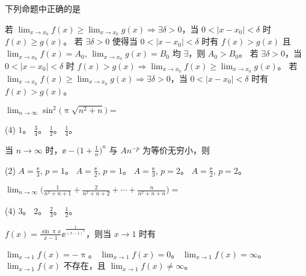 \begin{ti}
	下列命题中正确的是
	\begin{tasks}
		\task 若 $\lim_{x \to x_0} f(x) \geq \lim_{x \to x_0} g(x) \Rightarrow \exists \delta > 0$，当 $0 < |x-x_0| < \delta$ 时 $f(x) \geq g(x)$。\xeCJKnobreak
		\task 若 $\exists \delta > 0$ 使得当 $0 < |x-x_0| < \delta$ 时有 $f(x) > g(x)$ 且 $\lim_{x \to x_0} f(x) = A_0$, $\lim_{x \to x_0} g(x) = B_0$ 均 $\exists$，则 $A_0 > B_0$。
		\task 若 $\exists \delta > 0$，当 $0 < |x-x_0| < \delta$ 时 $f(x) > g(x) \Rightarrow \lim_{x \to x_0} f(x) \geq \lim_{x \to x_0} g(x)$。\xeCJKnobreak
		\task 若 $\lim_{x \to x_0} f(x) \geq \lim_{x \to x_0} g(x) \Rightarrow \exists \delta > 0$，当 $0 < |x-x_0| < \delta$ 时有 $f(x) > g(x)$。
	\end{tasks}
\end{ti}

\begin{ti}
	$\lim_{n \to \infty} \sin^2\bigl( \uppi \sqrt{n^2+n} \bigr) = $
	\begin{tasks}(4)
		\task $1$。
		\task $\frac{3}{4}$。
		\task $\frac{1}{2}$。
		\task $\frac{1}{4}$。
	\end{tasks}
\end{ti}

\begin{ti}
	当 $n \to \infty$ 时，$\ee - \biggl(1 + \frac{1}{n}\biggr)^n$ 与 $An^{-p}$ 为等价无穷小，则
	\begin{tasks}(2)
		\task $A = \frac{\ee}{3}$, $p = 1$。
		\task $A = \frac{\ee}{2}$, $p = 1$。
		\task $A = \frac{\ee}{3}$, $p = 2$。
		\task $A = \frac{\ee}{2}$, $p = 2$。
	\end{tasks}
\end{ti}

\begin{ti}
	$\lim_{n \to \infty} \biggl( \frac{1}{n^2+n+1} + \frac{2}{n^2+n+2} + \cdots + \frac{n}{n^2+n+n} \biggr) = $
	\begin{tasks}(4)
		\task $3$。
		\task $2$。
		\task $\frac{2}{3}$。
		\task $\frac{1}{2}$。
	\end{tasks}
\end{ti}

\begin{ti}
	$f(x) = \frac{\sin \uppi x}{x-1} \ee^{\frac{1}{(x-1)^3}}$，则当 $x \to 1$ 时有
	\begin{tasks}
		\task $\lim_{x \to 1} f(x) = - \uppi$。
		\task $\lim_{x \to 1} f(x) = 0$。
		\task $\lim_{x \to 1} f(x) = \infty$。
		\task $\lim_{x \to 1} f(x)$ 不存在，且 $\lim_{x \to 1} f(x) \ne \infty$。
	\end{tasks}
\end{ti}

